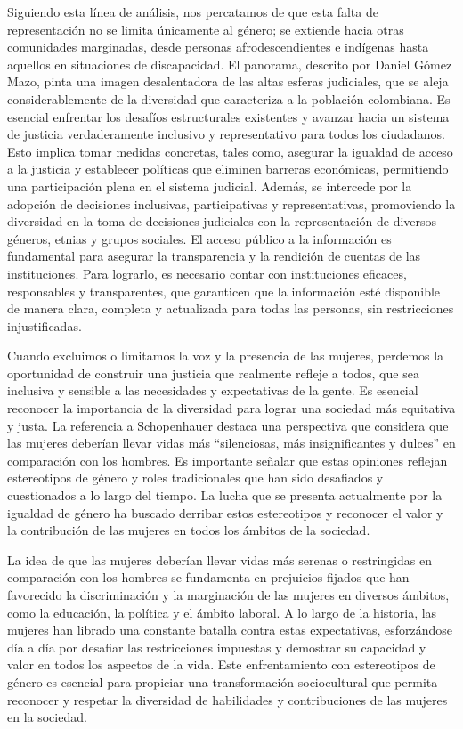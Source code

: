 \documentclass[letterpaper, 12pt]{article}
\begin{document}
Siguiendo esta línea de análisis, nos percatamos de que
esta falta de representación no se limita únicamente al
género; se extiende hacia otras comunidades marginadas,
desde personas afrodescendientes e indígenas hasta aquellos
en situaciones de discapacidad. El panorama, descrito por
Daniel Gómez Mazo, pinta una imagen desalentadora de las
altas esferas judiciales, que se aleja considerablemente de
la diversidad que caracteriza a la población colombiana. Es
esencial enfrentar los desafíos estructurales existentes y
avanzar hacia un sistema de justicia verdaderamente
inclusivo y representativo para todos los ciudadanos. Esto
implica tomar medidas concretas, tales como, asegurar la
igualdad de acceso a la justicia y establecer políticas que
eliminen barreras económicas, permitiendo una participación
plena en el sistema judicial. Además, se intercede por la
adopción de decisiones inclusivas, participativas y
representativas, promoviendo la diversidad en la toma de
decisiones judiciales con la representación de diversos
géneros, etnias y grupos sociales. El acceso público a la
información es fundamental para asegurar la transparencia y
la rendición de cuentas de las instituciones. Para
lograrlo, es necesario contar con instituciones eficaces,
responsables y transparentes, que garanticen que la
información esté disponible de manera clara, completa y
actualizada para todas las personas, sin restricciones
injustificadas.

Cuando excluimos o limitamos la voz y la presencia de las
mujeres, perdemos la oportunidad de construir una justicia
que realmente refleje a todos, que sea inclusiva y sensible
a las necesidades y expectativas de la gente. Es esencial
reconocer la importancia de la diversidad para lograr una
sociedad más equitativa y justa. La referencia a
Schopenhauer destaca una perspectiva que considera que las
mujeres deberían llevar vidas más ``silenciosas, más
insignificantes y dulces'' en comparación con los hombres.
Es importante señalar que estas opiniones reflejan
estereotipos de género y roles tradicionales que han sido
desafiados y cuestionados a lo largo del tiempo. La lucha
que se presenta actualmente por la igualdad de género ha
buscado derribar estos estereotipos y reconocer el valor y
la contribución de las mujeres en todos los ámbitos de la
sociedad.

La idea de que las mujeres deberían llevar vidas más
serenas o restringidas en comparación con los hombres se
fundamenta en prejuicios fijados que han favorecido la
discriminación y la marginación de las mujeres en diversos
ámbitos, como la educación, la política y el ámbito
laboral. A lo largo de la historia, las mujeres han librado
una constante batalla contra estas expectativas,
esforzándose día a día por desafiar las restricciones
impuestas y demostrar su capacidad y valor en todos los
aspectos de la vida. Este enfrentamiento con estereotipos
de género es esencial para propiciar una transformación
sociocultural que permita reconocer y respetar la
diversidad de habilidades y contribuciones de las mujeres
en la sociedad.
\end{document}

